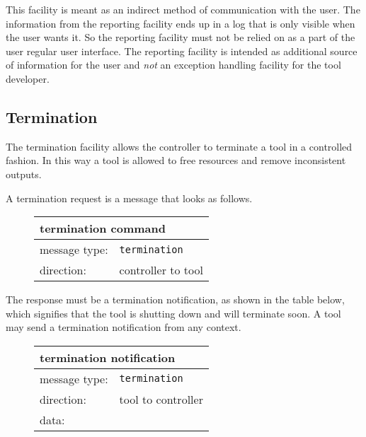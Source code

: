 \documentclass{article}
\newcommand{\msg}[1]{\texttt{#1}}
\begin{document}
   \noindent This facility is meant as an indirect method of communication with
   the user. The information from the reporting facility ends up in a log that
   is only visible when the user wants it. So the reporting facility must not
   be relied on as a part of the user regular user interface.  The reporting
   facility is intended as additional source of information for the user and
   \emph{not} an exception handling facility for the tool developer.

  \subsection{Termination}

   The termination facility allows the controller to terminate a tool in a
   controlled fashion.  In this way a tool is allowed to free resources
   and remove inconsistent outputs.
   
   \noindent A termination request is a message that looks as follows.

   \begin{figure}[H]
    \begin{center}
     \begin{tabular}{|ll|}
      \hline
       \multicolumn{2}{|l|}{\textbf{termination command}} \\
      \hline
       message type:    & \msg{termination} \\
      \hline
       direction:       & controller to tool \\
      \hline
     \end{tabular}
    \end{center}
   \end{figure}
   \vspace{-0.5cm}

   \noindent The response must be a termination notification, as shown in the
   table below, which signifies that the tool is shutting down and will
   terminate soon. A tool may send a termination notification from any context.

   \begin{figure}[H]
    \begin{center}
     \begin{tabular}{|ll|}
      \hline
       \multicolumn{2}{|l|}{\textbf{termination notification}} \\
      \hline
       message type:   & \msg{termination} \\
      \hline
       direction:      & tool to controller \\
       data:           & \\
      \hline
     \end{tabular}
    \end{center}
   \end{figure}
   \vspace{-0.5cm}
\end{document}
